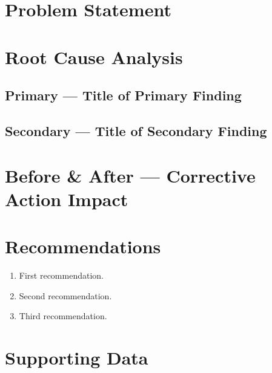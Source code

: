 \documentclass[report]{lirn}
\begin{document}
\section{Problem Statement}


\section{Root Cause Analysis}

\subsection{Primary --- Title of Primary Finding}


\subsection{Secondary --- Title of Secondary Finding}


\section{Before \& After --- Corrective Action Impact}


\section{Recommendations}

\begin{enumerate}
  \item First recommendation.
  \item Second recommendation.
  \item Third recommendation.
\end{enumerate}

\newpage
\appendix
\section{Supporting Data}


\lirnend[Report]

\lirndisclaimers
\end{document}
